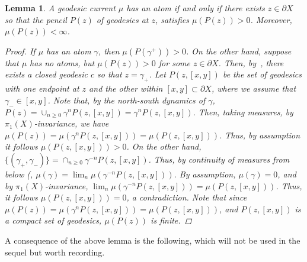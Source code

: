 \documentclass[12pt,article]{amsart}
\numberwithin{equation}{section}
\numberwithin{figure}{section}
\newtheorem{lemma}[equation]{Lemma}
\theoremstyle{definition}
\theoremstyle{plain}
\begin{document}
\begin{lemma}
A geodesic current $\mu$ has an atom if and only if there exists $z \in \partial X$ so that the pencil $P(z)$ of geodesics at $z$, satisfies $\mu(P(z))>0$. Moreover, $\mu(P(z))<\infty$.
\label{lem:atompencil}
\begin{proof}
If $\mu$ has an atom $\gamma$, then $\mu(P(\gamma^+))>0$.
On the other hand, suppose that $\mu$ has no atoms, but $\mu(P(z))>0$ for some $z \in \partial X$.
Then, by~\cite[Proposition~8.2.8]{Martelli16:IntroGeoTop}, there exists a closed geodesic $c$ so that $z=\gamma_+$. Let $P(z,[x,y])$ be the set of geodesics with one endpoint at $z$ and the other within $[x,y] \subset \partial X$, where we assume that $\gamma_-\in [x,y]$. 
Note that, by the north-south dynamics of $\gamma$, $P(z)=\cup_{n \geq 0} \gamma^n P(z,[x,y]) = \gamma^n P(z,[x,y])$. Then, taking measures, by  $\pi_1(X)$-invariance, we have
$\mu(P(z)) = \mu(\gamma^n P(z,[x,y]))=\mu(P(z,[x,y]))$. Thus, by assumption it follows $\mu(P(z,[x,y]))>0$.
On the other hand, $\{(\gamma_+,\gamma_-)\} =\cap_{n \geq 0} \gamma^{-n} P(z,[x,y])$.
Thus, by continuity of measures from below (\cite[Theorem~D]{Ham50:Measure}, $\mu(\gamma)=\lim_{n} \mu(\gamma^{-n} P(z,[x,y]))$.
By assumption, $\mu(\gamma)=0$, and by $\pi_1(X)$-invariance, $\lim_{n} \mu( \gamma^{-n} P(z,[x,y]) ) = \mu(P(z,[x,y]))$. Thus, it follows $\mu(P(z,[x,y]))=0$, a contradiction.
Note that since $\mu(P(z)) = \mu(\gamma^n P(z,[x,y]))=\mu(P(z,[x,y]))$, and $P(z,[x,y])$ is a compact set of geodesics, $\mu(P(z))$ is finite.
\end{proof}
\end{lemma}

A consequence of the above lemma is the following, which will not be used in the sequel but worth recording.
\end{document}
